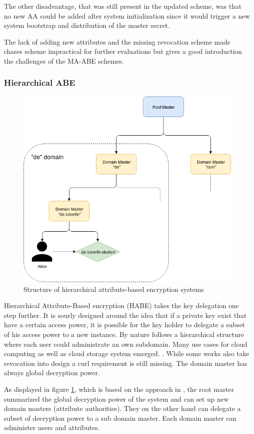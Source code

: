 The other disadvantage, that was still present in the updated scheme, was that no new \ac{AA} could be added after system initialization since it would trigger a new system bootstrap and distribution of the master secret. 

The lack of adding new attributes and the missing revocation scheme made chases scheme impractical for further evaluations but gives a good introduction the challenges of the \ac{MA-ABE} schemes.

\subsubsection{Hierarchical \ac{ABE}}
\label{sec:HABE}

\begin{figure}[!ht]
\centering
    \includegraphics[width=0.5\linewidth]{img/HABE.png}
    \caption{Structure of hierarchical attribute-based encryption systems}
    \label{fig:habe}
\end{figure}

Hierarchical Attribute-Based encryption (\ac{HABE}) takes the key delegation one step further. It is sourly designed around the idea that if a private key exist that have a certain access power, it is possible for the key holder to delegate a subset of his access power to a new instance. By nature follows a hierarchical structure where each user could administrate an own subdomain. Many use cases for cloud computing as well as cloud storage system emerged. \cite{Wang:2010:HAE:1866307.1866414}. While some works also take revocation into design a curl requirement is still missing. The domain master has always global decryption power. 

As displayed in figure \ref{fig:habe}, which is based on the approach in \cite{wang2011hierarchical}, the root master summarized the global decryption power of the system and can set up new domain masters (attribute authorities). They on the other hand can delegate a subset of decryption power to a sub domain master. Each domain master can administer users and attributes.


